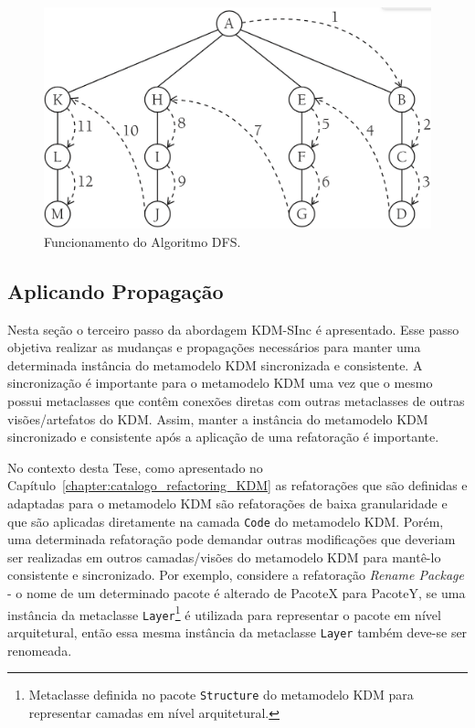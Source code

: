 \begin{figure}[h]
	\centering
	\caption{Funcionamento do Algoritmo DFS.}
	\label{fig:dfsalg}
	\includegraphics[scale=0.3]{images/algWorks2}
	\fautor
\end{figure}

\subsection{Aplicando Propagação}\label{subsec:aplicar_propagacao_KDM-SInc}
Nesta seção o terceiro passo da abordagem KDM-SInc é apresentado. Esse passo objetiva realizar as mudanças e propagações necessários para manter uma determinada instância do metamodelo KDM sincronizada e consistente. A sincronização é importante para o metamodelo KDM uma vez que o mesmo possui metaclasses que contêm conexões diretas com outras metaclasses de outras visões/artefatos do KDM. Assim, manter a instância do metamodelo KDM sincronizado e consistente após a aplicação de uma refatoração é importante. 

No contexto desta Tese, como apresentado no Capítulo~\ref{chapter:catalogo_refactoring_KDM} as refatorações que são definidas e adaptadas para o metamodelo KDM são refatorações de baixa granularidade e que são aplicadas diretamente na camada \texttt{Code} do metamodelo KDM. Porém, uma determinada refatoração pode demandar outras modificações que deveriam ser realizadas em outros camadas/visões do metamodelo KDM para mantê-lo consistente e sincronizado. Por exemplo, considere a refatoração \textit{Rename Package} - o nome de um determinado pacote é alterado de PacoteX para PacoteY, se uma instância da metaclasse \texttt{Layer}\footnote{Metaclasse definida no pacote \texttt{Structure} do metamodelo KDM para representar camadas em nível arquitetural.} é utilizada para representar o pacote em nível arquitetural, então essa mesma instância da metaclasse \texttt{Layer} também deve-se ser renomeada. 

